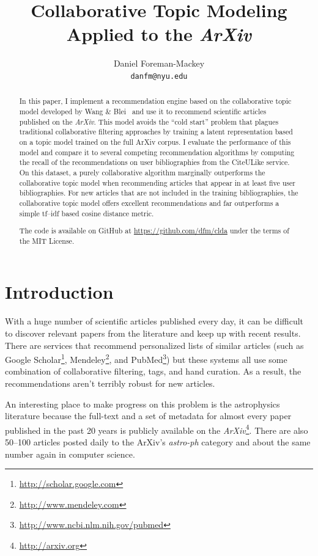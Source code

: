 \documentclass[11pt]{article}
\title{Collaborative Topic Modeling Applied to the \emph{ArXiv}}
\author{Daniel Foreman-Mackey \\ {\tt danfm@nyu.edu} \\}
\begin{document}
\maketitle

\begin{abstract}
In this paper, I implement a recommendation engine based on the collaborative
topic model developed by Wang \& Blei~ and use it to recommend
scientific articles published on the \emph{ArXiv}.
This model avoids the ``cold start'' problem that plagues traditional
collaborative filtering approaches by training a latent representation based
on a topic model trained on the full ArXiv corpus.
I evaluate the performance of this model and compare it to several competing
recommendation algorithms by computing the recall of the recommendations on
user bibliographies from the CiteULike service.
On this dataset, a purely collaborative algorithm marginally outperforms the
collaborative topic model when recommending articles that appear in at least
five user bibliographies.
For new articles that are not included in the training bibliographies, the
collaborative topic model offers excellent recommendations and far outperforms
a simple tf--idf based cosine distance metric.

The code is available on GitHub at \url{https://github.com/dfm/clda} under
the terms of the MIT License.
\end{abstract}

\section{Introduction}

With a huge number of scientific articles published every day, it can be
difficult to discover relevant papers from the literature and keep up with
recent results.
There are services that recommend personalized lists of similar articles
(such as Google Scholar\footnote{\url{http://scholar.google.com}},
Mendeley\footnote{\url{http://www.mendeley.com}}, and
PubMed\footnote{\url{http://www.ncbi.nlm.nih.gov/pubmed}}) but these systems
all use some combination of collaborative filtering, tags, and hand curation.
As a result, the recommendations aren't terribly robust for new articles.

An interesting place to make progress on this problem is the astrophysics
literature because the full-text and a set of metadata for almost every paper
published in the past 20 years is publicly available on the
\emph{ArXiv}\footnote{\url{http://arxiv.org}}.
There are also 50--100 articles posted daily to the ArXiv's \emph{astro-ph}
category and about the same number again in computer science.
\end{document}
